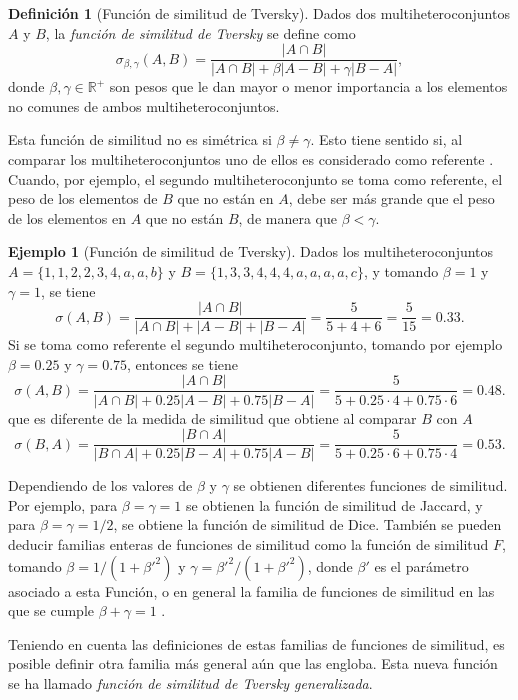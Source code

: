 \documentclass[a4paper,10pt,twoside]{article}
\theoremstyle{definition}
\newtheorem{definition}{Definición}
\newtheorem{example}{Ejemplo}
\begin{document}
\begin{definition}[Función de similitud de Tversky]
Dados dos multiheteroconjuntos $A$ y $B$, la \emph{función de similitud de Tversky} se define como
\[
\sigma_{\beta,\gamma} (A,B) = \frac{|A\cap B|}{|A\cap B|+\beta |A-B|+\gamma |B-A|},
\]
donde $\beta,\gamma\in \mathbb{R}^+$ son pesos que le dan mayor o menor importancia a los elementos no comunes de ambos multiheteroconjuntos.
\end{definition}

Esta función de similitud no es simétrica si $\beta\neq \gamma$.
Esto tiene sentido si, al comparar los multiheteroconjuntos uno de ellos es considerado como referente \cite{tversky1977features}.
Cuando, por ejemplo, el segundo multiheteroconjunto se toma como referente, el peso de los elementos de $B$ que no están en $A$, debe ser más grande que el peso de los elementos en $A$ que no están $B$, de manera que $\beta<\gamma$.

\begin{example}[Función de similitud de Tversky]
Dados los multiheteroconjuntos $A=\{1,1,2,2,3,\allowbreak 4,a,a,b\}$ y $B=\{1,3,3,4,4,4,a,a,a,a,c\}$, y tomando $\beta=1$ y $\gamma=1$, se tiene
\[
\sigma(A,B) = \frac{|A\cap B|}{|A\cap B|+ |A-B|+ |B-A|} = \frac{5}{5+4+6} = \frac{5}{15} = 0.33.
\]
Si se toma como referente el segundo multiheteroconjunto, tomando por ejemplo $\beta=0.25$ y $\gamma=0.75$, entonces se tiene
\[
\sigma(A,B) = \frac{|A\cap B|}{|A\cap B|+ 0.25|A-B|+ 0.75|B-A|} = \frac{5}{5+0.25\cdot 4+0.75\cdot 6} = 0.48.
\]
que es diferente de la medida de similitud que obtiene al comparar $B$ con $A$
\[
\sigma(B,A) = \frac{|B\cap A|}{|B\cap A|+ 0.25|B-A|+ 0.75|A-B|} = \frac{5}{5+0.25\cdot 6+0.75\cdot 4} = 0.53.
\]
\end{example}

Dependiendo de los valores de $\beta$ y $\gamma$ se obtienen diferentes funciones de similitud.
Por ejemplo, para $\beta=\gamma=1$ se obtienen la función de similitud de Jaccard, y para $\beta=\gamma=1/2$, se obtiene la función de
similitud de Dice.
También se pueden deducir familias enteras de funciones de similitud como la función de similitud $F$, tomando
$\beta=1/(1+\beta'^2)$ y $\gamma=\beta'^2/(1+\beta'^2)$, donde $\beta'$ es el parámetro asociado a esta Función, o en general la familia de funciones de similitud en las que se cumple $\beta+\gamma=1$ \cite{rodrguez2003determining}.

Teniendo en cuenta las definiciones de estas familias de funciones de similitud, es posible definir otra familia más general aún que las engloba. 
Esta nueva función se ha llamado \emph{función de similitud de Tversky generalizada}.
\end{document}
